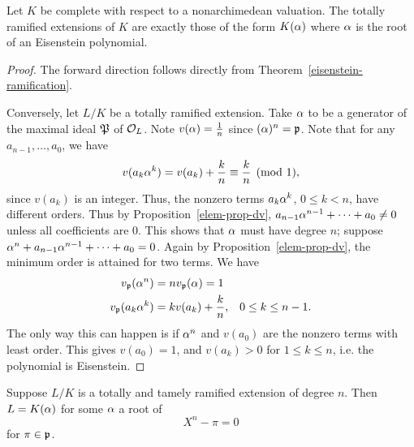 \begin{thm}
Let $K$ be complete with respect to a nonarchimedean valuation. 
The totally ramified extensions of $K$ are exactly those of the form $K(\alpha)$ where $\alpha$ is the root of an Eisenstein polynomial.
\end{thm}
\begin{proof}
The forward direction follows directly from Theorem~\ref{eisenstein-ramification}.

Conversely, let $L/K$ be a totally ramified extension. Take $\alpha$ to be a generator of the maximal ideal $\mathfrak{P}$ of $\mathcal{O}_L$. Note $v(\alpha)=\frac{1}{n}$ since $(\alpha)^n=\mathfrak{p}$. Note that for any $a_{n-1},\ldots, a_0$, we have
\[
v(a_k\alpha^k)=v(a_k)+\frac{k}{n}\equiv \frac{k}{n}\pmod 1,
\]
since $v(a_k)$ is an integer. Thus, the nonzero terms $a_k\alpha^k$, $0\le k<n$, have different orders. Thus by Proposition~\ref{elem-prop-dv}, $a_{n-1}\alpha^{n-1}+\cdots +a_0\ne 0$ unless all coefficients are 0. This shows that $\alpha$ must have degree $n$; suppose $\alpha^n+a_{n-1}\alpha^{n-1}+\cdots +a_0=0$. Again by Proposition~\ref{elem-prop-dv}, the minimum order is attained for two terms. We have
\begin{align*}
v_{\mathfrak{p}}(\alpha^n)&=nv_{\mathfrak{p}}(\alpha)=1\\
v_{\mathfrak{p}}(a_k\alpha^k)&=kv(a_k)+\frac{k}{n},&0\le k\le n-1.
\end{align*}
The only way this can happen 
is if $\alpha^n$ and $v(a_0)$ are the nonzero terms with least order. This gives $v(a_0)=1$, and $v(a_k)>0$ for $1\le k\le n$, i.e. the polynomial is Eisenstein.
\end{proof}
\begin{thm}
Suppose $L/K$ is a totally and tamely ramified extension of degree $n$.
Then $L=K(\alpha)$ for some $\alpha$ a root of
\[
X^n-\pi=0
\]
for $\pi \in \mathfrak{p}$.
%
\end{thm}
